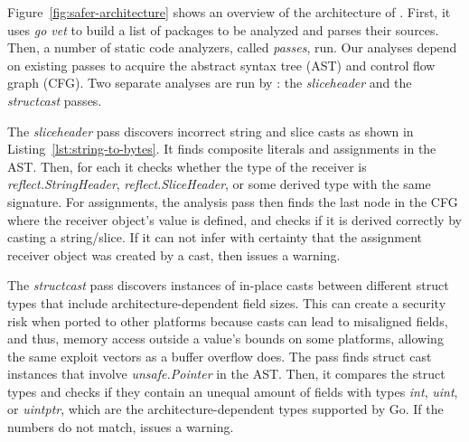 


Figure~\ref{fig:safer-architecture} shows an overview of the architecture of \toolSA{}.
First, it uses \textit{go vet} to build a list of packages to be analyzed and parses their sources.
Then, a number of static code analyzers, called \textit{passes}, run.
Our analyses depend on existing passes to acquire the abstract syntax tree (AST) and control flow graph (CFG).
Two separate analyses are run by \toolSA{}: the \textit{sliceheader} and the \textit{structcast} passes. %


The \textit{sliceheader} pass discovers incorrect string and slice casts as shown in Listing~\ref{lst:string-to-bytes}.
It finds composite literals and assignments in the AST.
Then, for each it checks whether the type of the %
receiver is \textit{reflect.StringHeader}, \textit{reflect.SliceHeader}, or some derived type with the same signature.
For assignments, the analysis pass then finds the last node in the CFG where the receiver object's value is defined, and checks if it is derived correctly by casting a string/slice.
If it can not infer with certainty that the assignment receiver object was created by a cast, then \toolSA{} issues a warning.

The \textit{structcast} pass discovers instances of in-place casts between different struct types that include architecture-dependent field sizes. 
This can create a security risk when ported to other platforms because \unsafe{} casts can lead to misaligned fields, and thus, memory access outside a value's bounds on some platforms, allowing the same exploit vectors as a buffer overflow does.
The pass finds struct cast instances that involve \textit{unsafe.Pointer} in the AST.
Then, it compares the struct types and checks if they contain an unequal amount of fields with types \textit{int}, \textit{uint}, or \textit{uintptr}, which are the architecture-dependent types supported by Go.
If the numbers do not match, \toolSA{} issues a warning.

